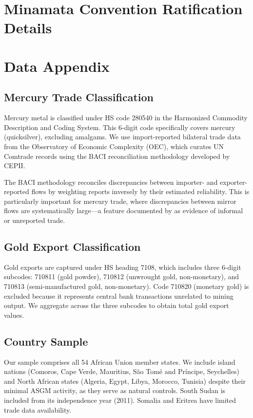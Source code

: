 \documentclass[12pt]{article}
\begin{document}



\section{Minamata Convention Ratification Details}




\section{Data Appendix}

\subsection{Mercury Trade Classification}

Mercury metal is classified under HS code 280540 in the Harmonized Commodity Description and Coding System. This 6-digit code specifically covers mercury (quicksilver), excluding amalgams. We use import-reported bilateral trade data from the Observatory of Economic Complexity (OEC), which curates UN Comtrade records using the BACI reconciliation methodology developed by CEPII.

The BACI methodology reconciles discrepancies between importer- and exporter-reported flows by weighting reports inversely by their estimated reliability. This is particularly important for mercury trade, where discrepancies between mirror flows are systematically large---a feature documented by \citet{fritz2022smuggling} as evidence of informal or unreported trade.

\subsection{Gold Export Classification}

Gold exports are captured under HS heading 7108, which includes three 6-digit subcodes: 710811 (gold powder), 710812 (unwrought gold, non-monetary), and 710813 (semi-manufactured gold, non-monetary). Code 710820 (monetary gold) is excluded because it represents central bank transactions unrelated to mining output. We aggregate across the three subcodes to obtain total gold export values.

\subsection{Country Sample}

Our sample comprises all 54 African Union member states. We include island nations (Comoros, Cape Verde, Mauritius, S\~{a}o Tom\'{e} and Pr\'{i}ncipe, Seychelles) and North African states (Algeria, Egypt, Libya, Morocco, Tunisia) despite their minimal ASGM activity, as they serve as natural controls. South Sudan is included from its independence year (2011). Somalia and Eritrea have limited trade data availability.
\end{document}
